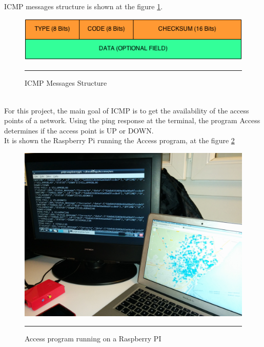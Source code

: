 \documentclass[12pt, a4paper,twoside]{tesi_upf}
\begin{document}
            ICMP messages structure is shown at the figure \ref{fig:ICMP}.
            
            
        \begin{figure}[htbp]
          \centering
              \includegraphics[scale=0.7]{./figures/ICMP.png}
              \rule{32em}{0.5pt}
          \caption[ICMP Messages Structure]{ICMP Messages Structure}
          \label{fig:ICMP}
        \end{figure}

        \\
       
       For this project, the main goal of ICMP is to get the availability of the access points of a network. Using the ping response at the terminal, the program Access determines if the access point is UP or DOWN.\\
        
        It is shown the Raspberry Pi running the Access program, at the figure \ref{fig:Rasprun}
        
        \begin{figure}[htbp]
          \centering
              \includegraphics[scale=0.12]{./figures/RaspRun.jpg}
              \rule{32em}{0.5pt}
          \caption[Access program running on a Raspberry PI]{Access program running on a Raspberry PI}
          \label{fig:Rasprun}
        \end{figure}
\end{document}
